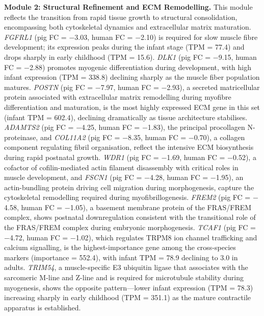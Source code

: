 \documentclass[10pt,a4paper]{article}
\begin{document}
\textbf{Module 2: Structural Refinement and ECM Remodelling.} This module reflects the transition from rapid tissue growth to structural consolidation, encompassing both cytoskeletal dynamics and extracellular matrix maturation. \textit{FGFRL1} (pig FC = $-$3.03, human FC = $-$2.10) is required for slow muscle fibre development\cite{amann_fgfrl1_2014}; its expression peaks during the infant stage (TPM = 77.4) and drops sharply in early childhood (TPM = 15.6). \textit{DLK1} (pig FC = $-$9.15, human FC = $-$2.88) promotes myogenic differentiation during development\cite{waddell_dlk1_2010,andersen_dual_2013}, with high infant expression (TPM = 338.8) declining sharply as the muscle fiber population matures. \textit{POSTN} (pig FC = $-$7.97, human FC = $-$2.93), a secreted matricellular protein associated with extracellular matrix remodelling during myofibre differentiation and maturation\cite{ozdemir_periostin_2014}, is the most highly expressed ECM gene in this set (infant TPM = 602.4), declining dramatically as tissue architecture stabilises. \textit{ADAMTS2} (pig FC = $-$4.25, human FC = $-$1.83), the principal procollagen N-proteinase\cite{colige_cdna_1997}, and \textit{COL11A2} (pig FC = $-$8.35, human FC = $-$0.70), a collagen component regulating fibril organisation\cite{sun_collagen_2020}, reflect the intensive ECM biosynthesis during rapid postnatal growth. \textit{WDR1} (pig FC = $-$1.69, human FC = $-$0.52), a cofactor of cofilin-mediated actin filament disassembly with critical roles in muscle development\cite{ono_functions_2018}, and \textit{FSCN1} (pig FC = $-$4.28, human FC = $-$1.95), an actin-bundling protein driving cell migration during morphogenesis\cite{adams_roles_2004}, capture the cytoskeletal remodelling required during myofibrillogenesis. \textit{FREM2} (pig FC = $-$4.58, human FC = $-$1.05), a basement membrane protein of the FRAS/FREM complex\cite{kiyozumi_breakdown_2006}, shows postnatal downregulation consistent with the transitional role of the FRAS/FREM complex during embryonic morphogenesis. \textit{TCAF1} (pig FC = $-$4.72, human FC = $-$1.02), which regulates TRPM8 ion channel trafficking and calcium signalling\cite{gkika_trp_2015}, is the highest-importance gene among the cross-species markers (importance = 552.4), with infant TPM = 78.9 declining to 3.0 in adults. \textit{TRIM54}, a muscle-specific E3 ubiquitin ligase that associates with the sarcomeric M-line and Z-line and is required for microtubule stability during myogenesis\cite{gregorio_functional_2005}, shows the opposite pattern---lower infant expression (TPM = 78.3) increasing sharply in early childhood (TPM = 351.1) as the mature contractile apparatus is established.
\end{document}
